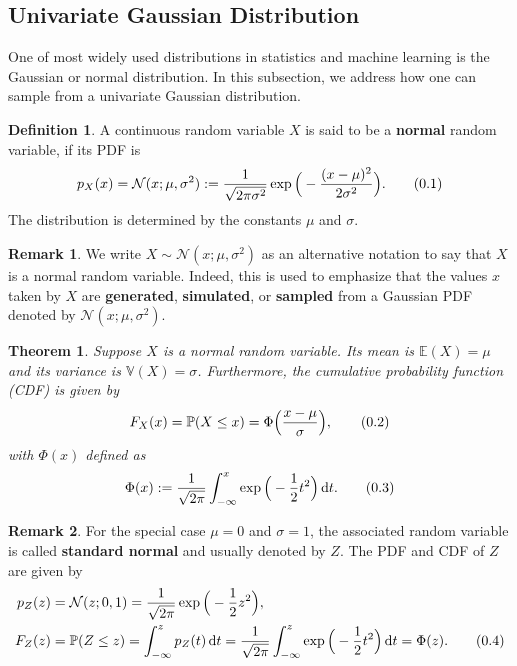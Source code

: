\documentclass[10pt]{article}
\newtheorem{thm}{Theorem}[section]
\theoremstyle{definition}
\newtheorem{defn}{Definition}[section]
\newtheorem*{rem}{Remark}
\newcommand\eqnum{\addtocounter{equation}{1}\tag{\arabic{section}.\arabic{equation}}}
\DeclareMathOperator{\df}{d\!}
\begin{document}
\subsection{Univariate Gaussian Distribution}
One of most widely used distributions in statistics and machine learning is the Gaussian or normal distribution. In this subsection, we address how one can sample from a univariate Gaussian distribution.
\begin{defn}
A continuous random variable $X$ is said to be a \textbf{normal} random variable, if its PDF is
\begin{equation*}
p_{X}(x) = \mathcal{N}(x; \mu, \sigma^2) := \frac{1}{\sqrt{2\pi\sigma^2}}\exp\Big(-\frac{(x-\mu)^2}{2\sigma^2}\Big).
\eqnum
\end{equation*}
The distribution is determined by the constants $\mu$ and $\sigma$. 
\end{defn}
\begin{rem}
We write $X\sim \mathcal{N}(x; \mu, \sigma^2)$ as an alternative notation to say that $X$ is a normal random variable. Indeed, this is used to emphasize that the values $x$ taken by $X$ are \textbf{generated}, \textbf{simulated}, or \textbf{sampled} from a Gaussian PDF denoted by $\mathcal{N}(x; \mu, \sigma^2)$. 
\end{rem}
\begin{thm}
Suppose $X$ is a normal random variable. Its mean is $\mathbb{E}(X) = \mu$ and its variance is $\mathbb{V}(X)=\sigma$. Furthermore, the cumulative probability function (CDF) is given by
\begin{equation*}
F_{X}(x) = \mathbb{P}(X \leq x) = \Phi\Big(\frac{x-\mu}{\sigma}\Big),
\eqnum
\end{equation*}
with $\Phi(x)$ defined as
\begin{equation*}
\Phi(x) := \frac{1}{\sqrt{2\pi}}\int_{-\infty}^{x}\exp\Big(-\frac{1}{2}t^2\Big)\df t.
\eqnum
\end{equation*}
\end{thm}
\begin{rem}
For the special case $\mu = 0$ and $\sigma = 1$, the associated random variable is called \textbf{standard normal} and usually denoted by $Z$. The PDF and CDF of $Z$ are given by
\begin{align*}
p_{Z}(z) &= \mathcal{N}(z; 0, 1) = \frac{1}{\sqrt{2\pi}}\exp\Big(-\frac{1}{2}z^2\Big), \\
F_Z(z) &= \mathbb{P}(Z\leq z) = \int_{-\infty}^{z}p_Z(t)\df t = 
\frac{1}{\sqrt{2\pi}}\int_{-\infty}^{z}\exp\Big(-\frac{1}{2}t^2\Big)\df t = \Phi(z).
\eqnum
\end{align*}
\end{rem}
\end{document}
